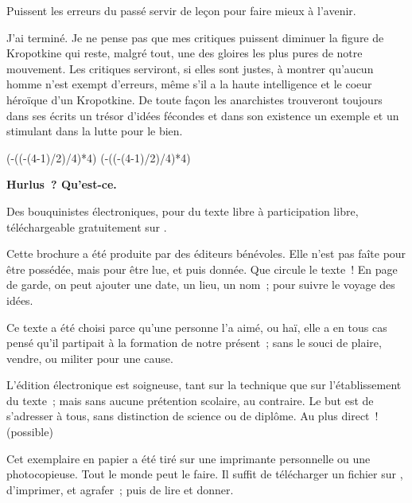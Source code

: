\documentclass[french,twoside]{book} %
\def\truncdiv#1#2{((#1-(#2-1)/2)/#2)}
\def\moduloop#1#2{(#1-\truncdiv{#1}{#2}*#2)}
\def\modulo#1#2{\number\numexpr\moduloop{#1}{#2}\relax}
\begin{document}
Puissent les erreurs du passé servir de leçon pour faire mieux à l’avenir.\par
J'ai terminé. Je ne pense pas que mes critiques puissent diminuer la figure de Kropotkine qui reste, malgré tout, une des gloires les plus pures de notre mouvement. Les critiques serviront, si elles sont justes, à montrer qu’aucun homme n’est exempt d’erreurs, même s’il a la haute intelligence et le coeur héroïque d’un Kropotkine. De toute façon les anarchistes trouveront toujours dans ses écrits un trésor d’idées fécondes et dans son existence un exemple et un stimulant dans la lutte pour le bien.
 


\ifbooklet
  \pagestyle{empty}
  \clearpage
  \ifnum\modulo{\value{page}}{4}=0 \hbox{}\newpage\hbox{}\newpage\fi
  \ifnum\modulo{\value{page}}{4}=1 \hbox{}\newpage\hbox{}\newpage\fi


  \hbox{}\newpage
  \ifodd\value{page}\hbox{}\newpage\fi
  {\centering\color{rubric}\bfseries\noindent\large
    Hurlus ? Qu’est-ce.\par
    \bigskip
  }
  \noindent Des bouquinistes électroniques, pour du texte libre à participation libre,
  téléchargeable gratuitement sur \href{https://hurlus.fr}{}.\par
  \bigskip
  \noindent Cette brochure a été produite par des éditeurs bénévoles.
  Elle n’est pas faîte pour être possédée, mais pour être lue, et puis donnée.
  Que circule le texte !
  En page de garde, on peut ajouter une date, un lieu, un nom ; pour suivre le voyage des idées.
  \par

  Ce texte a été choisi parce qu’une personne l’a aimé,
  ou haï, elle a en tous cas pensé qu’il partipait à la formation de notre présent ;
  sans le souci de plaire, vendre, ou militer pour une cause.
  \par

  L’édition électronique est soigneuse, tant sur la technique
  que sur l’établissement du texte ; mais sans aucune prétention scolaire, au contraire.
  Le but est de s’adresser à tous, sans distinction de science ou de diplôme.
  Au plus direct ! (possible)
  \par

  Cet exemplaire en papier a été tiré sur une imprimante personnelle
   ou une photocopieuse. Tout le monde peut le faire.
  Il suffit de
  télécharger un fichier sur \href{https://hurlus.fr}{},
  d’imprimer, et agrafer ; puis de lire et donner.\par
\end{document}
